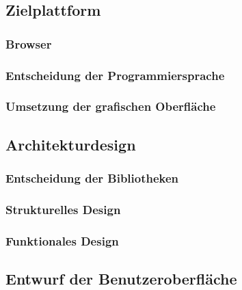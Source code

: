\documentclass[12pt]{article} %
\begin{document}
	\subsection{Zielplattform}
	\label{subsec:zielplattform}
	\zielplattformText
	
	\subsubsection{Browser}
	\label{subsubsec:plattform}
	\plattformText
	
	\subsubsection{Entscheidung der Programmiersprache}
	\label{subsubsec:programmiersprache}
	\programmierspracheText
	
	\subsubsection{Umsetzung der grafischen Oberfläche}
	\label{subsubsec:grafischeoberflaeche}
	\grafischeOberflaecheText
	
	\subsection{Architekturdesign}
	\label{subsec:architekturdesign}
	\architekturdesignText
	
	\subsubsection{Entscheidung der Bibliotheken}
	\label{subsubsec:bibliotheken}
	\bibliothekenText
	
	\subsubsection{Strukturelles Design}
	\label{subsubsec:strukturellesdesign}
	\strukturellesDesignText
	
	\subsubsection{Funktionales Design}
	\label{subsubsec:funktionalesdesign}
	\funktionalesDesignText
	
	\subsection{Entwurf der Benutzeroberfläche}
	\label{subsec:entwurfbenuzteroberflaeche}
	\entwurfbenuzteroberflaecheText
	
\end{document}
